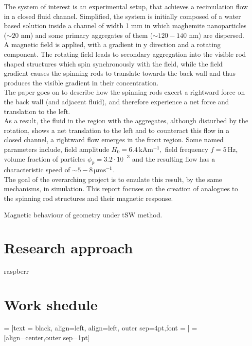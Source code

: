 \documentclass[12pt, DIV=12]{scrartcl}
\begin{document}
The system of interest is an experimental setup, that achieves a recirculation flow in a closed fluid channel. Simplified, the system is initially composed of a water based solution inside a channel of width 1 mm in which maghemite nanoparticles ($\sim 20$ nm) and some primary aggregates of them ($\sim 120-140$ nm) are dispersed.\\
A magnetic field is applied, with a gradient in y direction and a rotating component. The rotating field leads to secondary aggregation into the visible rod shaped structures which spin synchronously with the field, while the field gradient causes the spinning rods to translate towards the back wall and thus produces the visible gradient in their concentration.\\
The paper goes on to describe how the spinning rods excert a rightward force on the back wall (and adjacent fluid), and therefore experience a net force and translation to the left.\\
As a result, the fluid in the region with the aggregates, although disturbed by the rotation, shows a net translation to the left and to counteract this flow in a closed channel, a rightward flow emerges in the front region.
Some named parameters include, field amplitude $ H_0 =  \mathrm{6.4 \, kA m^{-1}},$ field frequency $f = \mathrm{5 \, Hz}$, volume fraction of particles $ \phi_\mathrm{p} =  \mathrm{3.2 \cdot 10^{-3}}$ and the resulting flow has a characteristic speed of $\sim 5-8 \, \mathrm{\mu m s^{-1}}$. \\

The goal of the overarching project is to emulate this result, by the same mechanisms, in simulation. This report focuses on the creation of analogues to the spinning rod structures and their magnetic response.

Magnetic behaviour of geometry under tSW method.
\section{Research approach}
raspberr
\section{Work shedule}

 = [text = black, align=left, align=left, outer sep=4pt,font = \footnotesize]
 =[align=center,outer sep=1pt]
\end{document}
